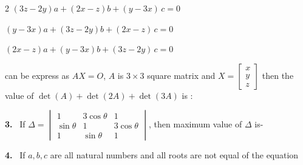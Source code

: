 \documentclass[10pt]{extarticle}
\newcommand{\qn}[1]{\par\smallskip\noindent\textbf{#1.}~}
\begin{document}
\begin{multicols}{2}
$(3z-2y)a+(2x-z)b+(y-3x)\,c=0$

$(y-3x)a+(3z-2y)b+(2x-z)\,c=0$

$(2x-z)a+(y-3x)b+(3z-2y)\,c=0$

can be express as $AX=O$, $A$ is $3\times3$ square matrix and $X=\begin{bmatrix}x\\y\\z\end{bmatrix}$ then the value of $\det(A)+\det(2A)+\det(3A)$ is :
\qn{3} If $\Delta=\begin{vmatrix}1&3\cos\theta&1\\\sin\theta&1&3\cos\theta\\1&\sin\theta&1\end{vmatrix}$, then maximum value of $\Delta$ is-
\qn{4} If $a,b,c$ are all natural numbers and all roots are not equal of the equation


\end{multicols}
\end{document}
